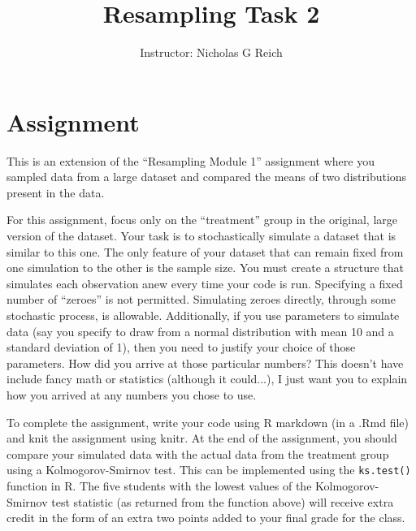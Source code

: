 \documentclass[11pt]{article}
\title{Resampling Task 2}
\author{%
        Instructor: Nicholas G Reich}
\date{}
\begin{document}
\maketitle


\section{Assignment}

This is an extension of the ``Resampling Module 1'' assignment where you sampled data from a large dataset and compared the means of two distributions present in the data.

For this assignment, focus only on the ``treatment'' group in the original, large version of the dataset.  Your task is to stochastically simulate a dataset that is similar to this one. The only feature of your dataset that can remain fixed from one simulation to the other is the sample size. You must create a structure that simulates each observation anew every time your code is run. Specifying a fixed number of ``zeroes'' is not permitted. Simulating zeroes directly, through some stochastic process, is allowable. Additionally, if you use parameters to simulate data (say you specify to draw from a normal distribution with mean 10 and a standard deviation of 1), then you need to justify your choice of those parameters. How did you arrive at those particular numbers? This doesn't have include fancy math or statistics (although it could...), I just want you to explain how you arrived at any numbers you chose to use. 

To complete the assignment, write your code using R markdown (in a .Rmd file) and knit the assignment using knitr. At the end of the assignment, you should compare your simulated data with the actual data from the treatment group using a Kolmogorov-Smirnov test. This can be implemented using the {\tt ks.test()} function in R. The five students with the lowest values of the Kolmogorov-Smirnov test statistic (as returned from the function above) will receive extra credit in the form of an extra two points added to your final grade for the class. %
\end{document}
